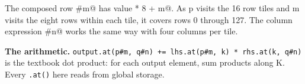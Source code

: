 The composed row \co@p#m@ has value \co@p * 8 + m@. As p visits the 16 row tiles and m visits the eight rows within each tile, it covers rows 0 through 127. The column expression \co@q#n@ works the same way with four columns per tile.

\textbf{The arithmetic.} \texttt{output.\allowbreak{}at(p\#\allowbreak{}m, q\#\allowbreak{}n) += lhs.\allowbreak{}at(p\#\allowbreak{}m, k) * rhs.\allowbreak{}at(k, q\#\allowbreak{}n)} is the textbook dot product: for each output element, sum products along K. Every \texttt{.at()} here reads from global storage.
